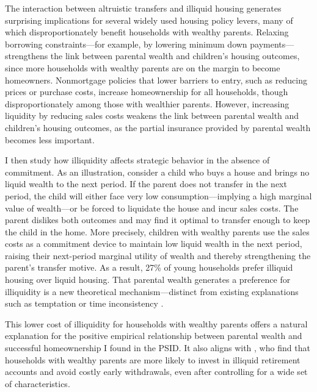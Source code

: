 \documentclass[12pt]{article}
\begin{document}
The interaction between altruistic transfers and illiquid housing generates surprising implications for several widely used housing policy levers, many of which disproportionately benefit households with wealthy parents. Relaxing borrowing constraints---for example, by lowering minimum down payments---strengthens the link between parental wealth and children's housing outcomes, since more households with wealthy parents are on the margin to become homeowners. Nonmortgage policies that lower barriers to entry, such as reducing prices or purchase costs, increase homeownership for all households, though disproportionately among those with wealthier parents. However, increasing liquidity by reducing sales costs weakens the link between parental wealth and children's housing outcomes, as the partial insurance provided by parental wealth becomes less important.

I then study how illiquidity affects strategic behavior in the absence of commitment. As an illustration, consider a child who buys a house and brings no liquid wealth to the next period. If the parent does not transfer in the next period, the child will either face very low consumption—implying a high marginal value of wealth—or be forced to liquidate the house and incur sales costs. The parent dislikes both outcomes and may find it optimal to transfer enough to keep the child in the home. More precisely, children with wealthy parents use the sales costs as a commitment device to maintain low liquid wealth in the next period, raising their next-period marginal utility of wealth and thereby strengthening the parent’s transfer motive. As a result, 27\% of young households prefer illiquid housing over liquid housing. That parental wealth generates a preference for illiquidity is a new theoretical mechanism---distinct from existing explanations such as temptation or time inconsistency \citep[e.g.,][]{attanasio2024temptation,laibson1997golden}.

This lower cost of illiquidity for households with wealthy parents offers a natural explanation for the positive empirical relationship between parental wealth and successful homeownership I found in the PSID. It also aligns with \citet{choukhmane2023benefits}, who find that households with wealthy parents are more likely to invest in illiquid retirement accounts and avoid costly early withdrawals, even after controlling for a wide set of characteristics.
\end{document}
